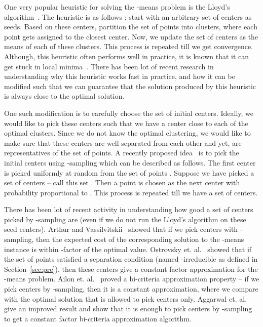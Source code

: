 \documentclass[a4paper]{article}
\begin{document}
One very popular heuristic for solving the -means problem is the Lloyd's algorithm~\cite{lloyd}. The heuristic is
as follows : start with an arbitrary set of  centers as seeds. Based on these  centers, partition the
set of points into  clusters, where each point gets assigned to the closest center. Now, we update the
set of centers as the means of each of these clusters. This process is repeated till we get convergence. Although,
this heuristic often performs well in practice, it is known that it can get stuck in local minima~\cite{ArthurV06}.
There has been lot of recent research in understanding why this heuristic works fast in practice, and how it can be modified such that we can guarantee that the solution produced by this heuristic is always close to the optimal solution.

One such modification  is to carefully choose the set of initial  centers.
Ideally, we would like to pick these centers such that we have a center close to each of the optimal clusters.
Since we do not know the optimal clustering, we would like to make sure that these centers are well separated from each
other and yet, are representatives of the set of points. A recently proposed idea~\cite{OstrovskyRSS06,ArthurV07} is to
pick the initial centers using -sampling which can be described as follows.
The first center is picked uniformly at random from the set of
points . Suppose we have picked a set of  centers -- call this set .
Then a point  is chosen as the next center
with probability proportional to . This process is repeated till we have a set of  centers.


There has been lot of recent activity in understanding how good a set of centers picked by -sampling are (even
if we do not run the Lloyd's algorithm on these seed centers).
Arthur and  Vassilvitskii~\cite{ArthurV07} showed that if we pick  centers with -sampling,
then the expected cost of the corresponding solution to the -means instance is within -factor of
the optimal value. Ostrovsky et. al.~\cite{OstrovskyRSS06} showed that if the set of points satisfied a separation 
condition (named -irreducible as defined in Section~\ref{sec:pre}), then these  centers give a constant factor approximation for the -means problem. Ailon et. al.~\cite{AJMonteleoni09}
proved a bi-criteria approximation property -- if we pick  centers by -sampling, then it is
a constant approximation, where we compare with the optimal solution that is allowed to pick  centers only.
Aggarwal et. al.~\cite{AggarwalDK09} give an improved result and show that it is enough to pick  centers by
-sampling to get a constant factor bi-criteria approximation algorithm.
\end{document}
